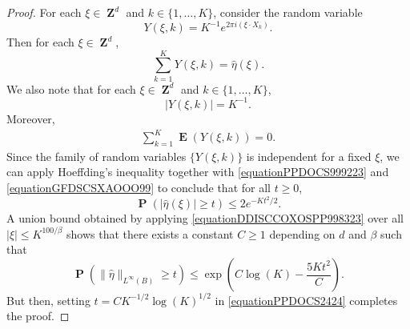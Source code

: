 \documentclass[12pt,reqno]{article}
\numberwithin{equation}{section}
\DeclareMathOperator{\ZZ}{\mathbf{Z}}
\numberwithin{theorem}{section}
\DeclareMathOperator{\EE}{\mathbf{E}}
\DeclareMathOperator{\PP}{\mathbf{P}}
\begin{document}
\begin{proof}
    For each $\xi \in \ZZ^d$ and $k \in \{ 1, \dots, K \}$, consider the random variable
    \begin{equation}
        Y(\xi,k) = K^{-1} e^{2 \pi i (\xi \cdot X_k)}.
    \end{equation}
    Then for each $\xi \in \ZZ^d$,
    \begin{equation} \label{equationPPDOCS999223}
        \sum_{k = 1}^K Y(\xi,k) = \widehat{\eta}(\xi).
    \end{equation}
    We also note that for each $\xi \in \ZZ^d$ and $k \in \{ 1, \dots, K \}$,
    \begin{equation} \label{equationGFDSCSXAOOO99}
        |Y(\xi,k)| = K^{-1}.
    \end{equation}
    Moreover,
    \begin{equation} \label{equationDOIJWIJCCCCC5555322}
    \begin{split}
        \sum_{k = 1}^K \EE(Y(\xi,k)) = 0.
    \end{split}
    \end{equation}
    Since the family of random variables $\{ Y(\xi,k) \}$ is independent for a fixed $\xi$, we can apply Hoeffding's inequality together with \eqref{equationPPDOCS999223} and \eqref{equationGFDSCSXAOOO99} to conclude that for all $t \geq 0$,
    \begin{equation} \label{equationDDISCCOXOSPP998323}
        \PP \left( |\widehat{\eta}(\xi)| \geq t \right) \leq 2 e^{-Kt^2/2}.
    \end{equation}
    A union bound obtained by applying \eqref{equationDDISCCOXOSPP998323} over all $|\xi| \leq K^{100/\beta}$ shows that there exists a constant $C \geq 1$ depending on $d$ and $\beta$ such that %
    \begin{equation} \label{equationPPDOCS2424}
        \PP \left( \| \widehat{\eta} \|_{L^\infty(B)} \geq t \right) \leq \exp \left( C \log(K) - \frac{5K t^2}{C} \right).
    \end{equation}
    But then, setting $t = CK^{-1/2} \log(K)^{1/2}$ in \eqref{equationPPDOCS2424} completes the proof.
\end{proof}
\end{document}
